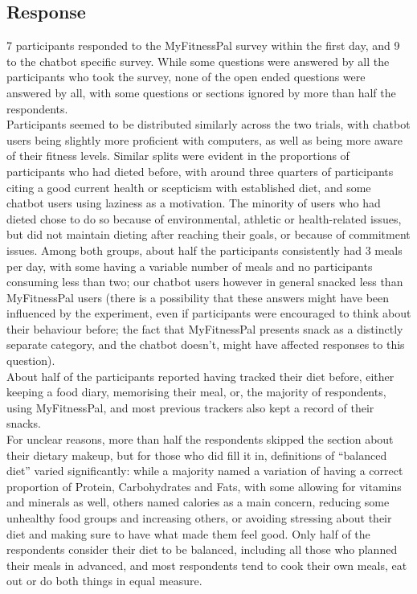 \subsection{Response}
7 participants responded to the MyFitnessPal survey within the first day, and 9 to the chatbot specific survey. While some questions were answered by all the participants who took the survey, none of the open ended questions were answered by all, with some questions or sections ignored by more than half the respondents. \\
Participants seemed to be distributed similarly across the two trials, with chatbot users being slightly more proficient with computers, as well as being more aware of their fitness levels. Similar splits were evident in the proportions of participants who had dieted before, with around three quarters of participants citing a good current health or scepticism with established diet, and some chatbot users using laziness as a motivation. The minority of users who had dieted chose to do so because of environmental, athletic or health-related issues, but did not maintain dieting after reaching their goals, or because of commitment issues. Among both groups, about half the participants consistently had 3 meals per day, with some having a variable number of meals and no participants consuming less than two; our chatbot users however in general snacked less than MyFitnessPal users (there is a possibility that these answers might have been influenced by the experiment, even if participants were encouraged to think about their behaviour before; the fact that MyFitnessPal presents snack as a distinctly separate category, and the chatbot doesn't, might have affected responses to this question). \\
About half of the participants reported having tracked their diet before, either keeping a food diary, memorising their meal, or, the majority of respondents, using MyFitnessPal, and most previous trackers also kept a record of their snacks. \\
For unclear reasons, more than half the respondents skipped the section about their dietary makeup, but for those who did fill it in, definitions of ``balanced diet'' varied significantly: while a majority named a variation of having a correct proportion of Protein, Carbohydrates and Fats, with some allowing for vitamins and minerals as well, others named calories as a main concern, reducing some unhealthy food groups and increasing others, or avoiding stressing about their diet and making sure to have what made them feel good. Only half of the respondents consider their diet to be balanced, including all those who planned their meals in advanced, and most respondents tend to cook their own meals, eat out or do both things in equal measure. \\
